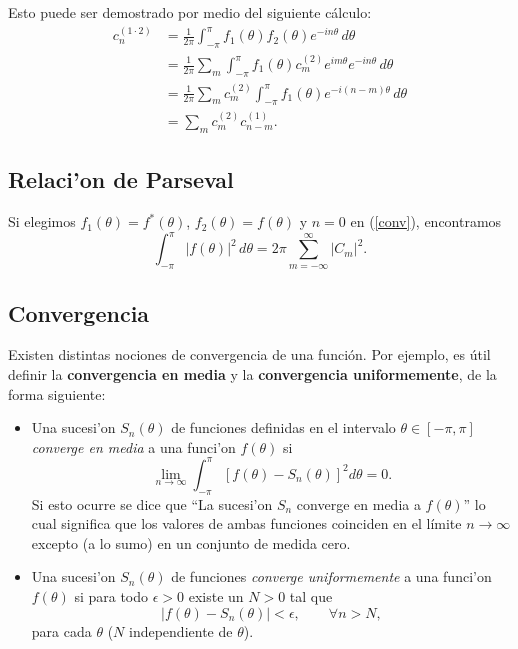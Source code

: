 Esto puede ser demostrado por medio del siguiente cálculo:
\begin{align}
c_n^{(1\cdot 2)} &= \frac{1}{2\pi}\int_{-\pi}^\pi f_1(\theta)f_2(\theta)e^{-in\theta}\,d\theta \\
 &= \frac{1}{2\pi}\sum_m \int_{-\pi}^\pi f_1(\theta)c_m^{(2)}e^{im\theta}e^{-in\theta}\,d\theta \\
 &= \frac{1}{2\pi}\sum_m c_m^{(2)}\int_{-\pi}^\pi f_1(\theta)e^{-i(n-m)\theta}\,d\theta \\
 &= \sum_m c_m^{(2)}c_{n-m}^{(1)}.
\end{align}


\subsection{Relaci'on de Parseval}
Si elegimos $f_1(\theta)=f^\ast (\theta)$, $f_2(\theta)=f(\theta)$ y $n=0$ en (\ref{conv}), encontramos
\begin{equation}
\boxed{\int_{-\pi}^\pi |f(\theta)|^2\,d\theta 
=  2\pi\sum_{m=-\infty}^\infty\left|C_m\right|^2.}
 \end{equation}

\subsection{Convergencia}
Existen distintas nociones de convergencia de una función. Por ejemplo, es útil definir la \textbf{convergencia en media} y la \textbf{convergencia uniformemente}, de la forma siguiente:
\begin{itemize}
\item Una sucesi'on $S_n(\theta)$ de funciones definidas en el intervalo $\theta\in[-\pi,\pi]$ \textit{converge en media} a una funci'on $f(\theta)$ si
\begin{equation}
\lim_{n\to\infty}\int_{-\pi}^{\pi}\left[f(\theta)-S_n(\theta)\right]^2d\theta=0.
\end{equation}
Si esto ocurre se dice que ``La sucesi'on $S_n$ converge en media a $f(\theta)$'' lo cual significa que los valores de ambas funciones coinciden en el límite $n\to\infty$ excepto (a lo sumo) en un conjunto de medida cero.

\item Una sucesi'on $S_n(\theta)$ de funciones \textit{converge uniformemente} a una funci'on $f(\theta)$ si para todo $\epsilon>0$ existe un $N>0$ tal que
\begin{equation}
\left|f(\theta)-S_n(\theta)\right|<\epsilon, \qquad \forall n>N,
\end{equation}
para cada $\theta$ ($N$ independiente de $\theta$).
\end{itemize}

